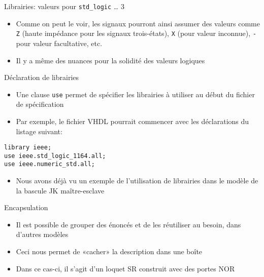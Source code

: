 \documentclass[presentation]{beamer}
\begin{document}
\begin{frame}[label={sec:org84c63d9},fragile]{Librairies: valeurs pour \texttt{std\_logic} \ldots{} 3}
 \begin{itemize}
\item Comme on peut le voir, les signaux pourront ainsi assumer des valeurs comme \texttt{Z} (haute impédance pour les signaux trois-états), \texttt{X} (pour valeur inconnue), \texttt{-} pour valeur facultative, etc.
\item Il y a même des nuances pour la solidité des valeurs logiques
\end{itemize}
\end{frame}

\begin{frame}[label={sec:org622308e},fragile]{Déclaration de librairies}
 \begin{itemize}
\item Une clause \texttt{use} permet de spécifier les librairies à utiliser au début du fichier de spécification
\item Par exemple, le fichier VHDL pourrait commencer avec les déclarations du listage suivant:
\end{itemize}

\begin{verbatim}
library ieee;
use ieee.std_logic_1164.all;
use ieee.numeric_std.all;
\end{verbatim}

\begin{itemize}
\item Nous avons déjà vu un exemple de l'utilisation de librairies dans le modèle de la bascule JK maître-esclave
\end{itemize}
\end{frame}

\begin{frame}[label={sec:orgd9f0dfc}]{Encapsulation}
\begin{itemize}
\item Il est possible de grouper des énoncés et de les réutiliser au besoin, dans d'autres modèles
\item Ceci nous permet de «cacher» la description dans une boîte
\item Dans ce cas-ci, il s'agit d'un loquet SR construit avec des portes NOR
\end{itemize}
\end{frame}
\end{document}
